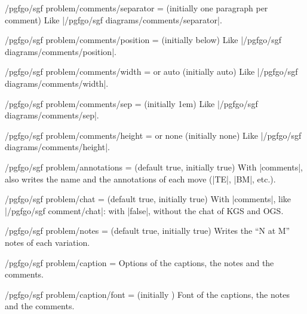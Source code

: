\begin{key}{/pgfgo/sgf problem/comments/separator =  (initially one paragraph per comment)}
	Like |/pgfgo/sgf diagrams/comments/separator|.
\end{key}

\begin{key}{/pgfgo/sgf problem/comments/position =  (initially below)}
	Like |/pgfgo/sgf diagrams/comments/position|.
\end{key}

\begin{key}{/pgfgo/sgf problem/comments/width =  or auto (initially auto)}
	Like |/pgfgo/sgf diagrams/comments/width|.
\end{key}

\begin{key}{/pgfgo/sgf problem/comments/sep =  (initially 1em)}
	Like |/pgfgo/sgf diagrams/comments/sep|.
\end{key}

\begin{key}{/pgfgo/sgf problem/comments/height =  or none (initially none)}
	Like |/pgfgo/sgf diagrams/comments/height|.
\end{key}

\begin{key}{/pgfgo/sgf problem/annotations =  (default true, initially true)}
	With |comments|, also writes the name and the annotations of each move (|TE|, |BM|, etc.).
\end{key}

\begin{key}{/pgfgo/sgf problem/chat =  (default true, initially true)}
	With |comments|, like |/pgfgo/sgf comment/chat|: with |false|, without the chat of KGS and OGS.
\end{key}

\begin{key}{/pgfgo/sgf problem/notes =  (default true, initially true)}
	Writes the ``N at M'' notes of each variation.
\end{key}

\begin{key}{/pgfgo/sgf problem/caption = }
	Options of the captions, the notes and the comments.
\end{key}

\begin{key}{/pgfgo/sgf problem/caption/font =  (initially \texttt{\string\small})}
	Font of the captions, the notes and the comments.

	\begin{codeexample}
	\end{codeexample}

\end{key}

